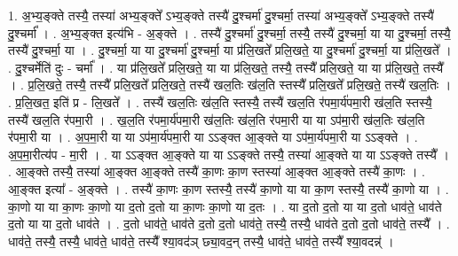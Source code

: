 \documentclass[17pt]{extarticle}
\begin{document}
1. अ॒भ्य॒ङ्क्ते तस्यै॒ तस्या॑ अभ्य॒ङ्क्ते᳚ ऽभ्य॒ङ्क्ते तस्यै॑ दु॒श्चर्मा॑ दु॒श्चर्मा॒ तस्या॑ अभ्य॒ङ्क्ते᳚ ऽभ्य॒ङ्क्ते तस्यै॑ दु॒श्चर्मा᳚ । . अ॒भ्य॒ङ्क्त इत्य॑भि - अ॒ङ्क्ते । . तस्यै॑ दु॒श्चर्मा॑ दु॒श्चर्मा॒ तस्यै॒ तस्यै॑ दु॒श्चर्मा॒ या या दु॒श्चर्मा॒ तस्यै॒ तस्यै॑ दु॒श्चर्मा॒ या । . दु॒श्चर्मा॒ या या दु॒श्चर्मा॑ दु॒श्चर्मा॒ या प्र॑लि॒खते᳚ प्रलि॒खते॒ या दु॒श्चर्मा॑ दु॒श्चर्मा॒ या प्र॑लि॒खते᳚ । . दु॒श्चर्मेति॑ दुः - चर्मा᳚ । . या प्र॑लि॒खते᳚ प्रलि॒खते॒ या या प्र॑लि॒खते॒ तस्यै॒ तस्यै᳚ प्रलि॒खते॒ या या प्र॑लि॒खते॒ तस्यै᳚ । . प्र॒लि॒खते॒ तस्यै॒ तस्यै᳚ प्रलि॒खते᳚ प्रलि॒खते॒ तस्यै॑ खल॒तिः ख॑ल॒ति स्तस्यै᳚ प्रलि॒खते᳚ प्रलि॒खते॒ तस्यै॑ खल॒तिः । . प्र॒लि॒खत॒ इति॑ प्र - लि॒खते᳚ । . तस्यै॑ खल॒तिः ख॑ल॒ति स्तस्यै॒ तस्यै॑ खल॒ति र॑पमा॒र्य॑पमा॒री ख॑ल॒ति स्तस्यै॒ तस्यै॑ खल॒ति र॑पमा॒री । . ख॒ल॒ति र॑पमा॒र्य॑पमा॒री ख॑ल॒तिः ख॑ल॒ति र॑पमा॒री या या ऽप॑मा॒री ख॑ल॒तिः ख॑ल॒ति र॑पमा॒री या । . अ॒प॒मा॒री या या ऽप॑मा॒र्य॑पमा॒री या ऽऽङ्क्त आ॒ङ्क्ते या ऽप॑मा॒र्य॑पमा॒री या ऽऽङ्क्ते । . अ॒प॒मा॒रीत्य॑प - मा॒री । . या ऽऽङ्क्त आ॒ङ्क्ते या या ऽऽङ्क्ते तस्यै॒ तस्या॑ आ॒ङ्क्ते या या ऽऽङ्क्ते तस्यै᳚ । . आ॒ङ्क्ते तस्यै॒ तस्या॑ आ॒ङ्क्त आ॒ङ्क्ते तस्यै॑ का॒णः का॒ण स्तस्या॑ आ॒ङ्क्त आ॒ङ्क्ते तस्यै॑ का॒णः । . आ॒ङ्क्त इत्या᳚ - अ॒ङ्क्ते । . तस्यै॑ का॒णः का॒ण स्तस्यै॒ तस्यै॑ का॒णो या या का॒ण स्तस्यै॒ तस्यै॑ का॒णो या । . का॒णो या या का॒णः का॒णो या द॒तो द॒तो या का॒णः का॒णो या द॒तः । . या द॒तो द॒तो या या द॒तो धाव॑ते॒ धाव॑ते द॒तो या या द॒तो धाव॑ते । . द॒तो धाव॑ते॒ धाव॑ते द॒तो द॒तो धाव॑ते॒ तस्यै॒ तस्यै॒ धाव॑ते द॒तो द॒तो धाव॑ते॒ तस्यै᳚ । . धाव॑ते॒ तस्यै॒ तस्यै॒ धाव॑ते॒ धाव॑ते॒ तस्यै᳚ श्या॒वद॑ञ् छ्या॒वद॒न् तस्यै॒ धाव॑ते॒ धाव॑ते॒ तस्यै᳚ श्या॒वदन्न्॑ । \newline
\end{document}
